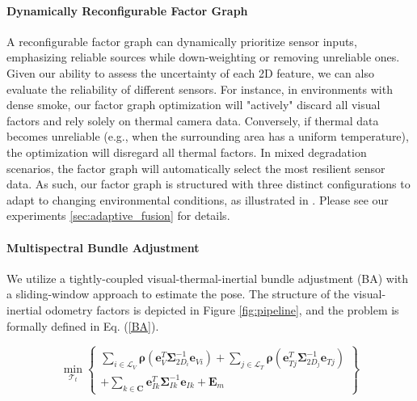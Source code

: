 
\paragraph{\textbf{Dynamically Reconfigurable Factor Graph}} A reconfigurable factor graph can dynamically prioritize sensor inputs, emphasizing reliable sources while down-weighting or removing unreliable ones. Given our ability to assess the uncertainty of each 2D feature, we can also evaluate the reliability of different sensors. For instance, in environments with dense smoke, our factor graph optimization will "actively" discard all visual factors and rely solely on thermal camera data. Conversely, if thermal data becomes unreliable (e.g., when the surrounding area has a uniform temperature), the optimization will disregard all thermal factors. In mixed degradation scenarios, the factor graph will automatically select the most resilient sensor data. As such, our factor graph is structured with three distinct configurations to adapt to changing environmental conditions, as illustrated in . Please see our experiments \ref{sec:adaptive_fusion} for details.


\paragraph{\textbf{Multispectral Bundle Adjustment}}

We utilize a tightly-coupled visual-thermal-inertial bundle adjustment (BA) with a sliding-window approach to estimate the pose. The structure of the visual-inertial odometry factors is depicted in Figure \ref{fig:pipeline}, and the problem is formally defined in Eq. (\ref{BA}).

\begin{equation}
\min _{\mathcal{T}_t}\left\{\begin{array}{l}
\sum_{i \in \mathcal{L}_V} \boldsymbol{\rho}\left(\mathbf{e}_V^T \boldsymbol{\Sigma}_{2 D_i}^{-1} \mathbf{e}_{V i}\right) + \sum_{j \in \mathcal{L}_T} \boldsymbol{\rho}\left(\mathbf{e}_{T j}^T \boldsymbol{\Sigma}_{2 D_j}^{-1} \mathbf{e}_{T j}\right) \\
+ \sum_{k \in \mathbf{C}} \mathbf{e}_{I k}^T \boldsymbol{\Sigma}_{I k}^{-1} \mathbf{e}_{I k} + \mathbf{E}_m
\end{array}\right\}
 \label{BA}
\end{equation}

